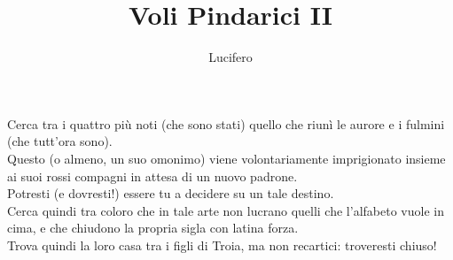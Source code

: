 \documentclass[12pt]{article}
\title{Voli Pindarici II}
\author{Lucifero}
\date{}
\begin{document}
\maketitle
\thispagestyle{empty}
\begin{center}
Cerca tra i quattro più noti (che sono stati) quello che riunì le aurore e i fulmini (che tutt'ora sono).\\
Questo (o almeno, un suo omonimo) viene volontariamente imprigionato insieme ai suoi rossi compagni in attesa di un nuovo padrone.\\
Potresti (e dovresti!) essere tu a decidere su un tale destino.\\
Cerca quindi tra coloro che in tale arte non lucrano quelli che l'alfabeto vuole in cima, e che chiudono la propria sigla con latina forza.\\
Trova quindi la loro casa tra i figli di Troia, ma non recartici: troveresti chiuso!\\

\end{center}
\end{document}
